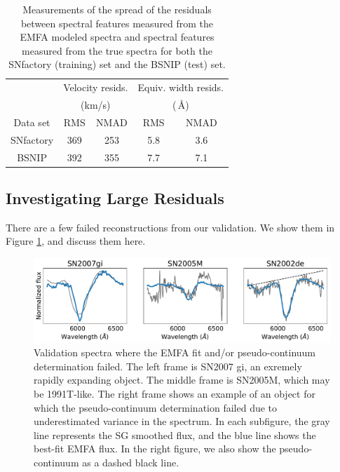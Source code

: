 \begin{table}[htbp]
    \centering
    \begin{tabular}{ccccc}\\\toprule
        & \multicolumn{2}{c}{Velocity resids.} & \multicolumn{2}{c}{Equiv. width resids.}\\
        & \multicolumn{2}{c}{(km/s)} & \multicolumn{2}{c}{(\,\AA)}\\
        Data set & RMS & NMAD & RMS & NMAD\\\midrule
        SNfactory & 369 & 253 & 5.8 & 3.6 \\
        BSNIP & 392 & 355 & 7.7 & 7.1 \\\bottomrule
    \end{tabular}
    \caption{Measurements of the spread of the residuals between spectral features measured from the EMFA modeled spectra and spectral features measured from the true spectra for both the SNfactory (training) set and the BSNIP (test) set.}
    \label{validation_results}
\end{table}

\subsection{Investigating Large Residuals}
\label{outliers}
There are a few failed reconstructions from our validation. We show them in Figure \ref{valid_failures}, and discuss them here.

\begin{figure}[htbp]
    \centering
    \includegraphics[width=\textwidth]{figures/si_feat_pca/fit_failures.pdf}
    \caption{Validation spectra where the EMFA fit and/or pseudo-continuum determination failed. The left frame is SN2007 gi, an exremely rapidly expanding object. The middle frame is SN2005M, which may be 1991T-like. The right frame shows an example of an object for which the pseudo-continuum determination failed due to underestimated variance in the spectrum. In each subfigure, the gray line represents the SG smoothed flux, and the blue line shows the best-fit EMFA flux. In the right figure, we also show the pseudo-continuum as a dashed black line.}
    \label{valid_failures}
\end{figure}

